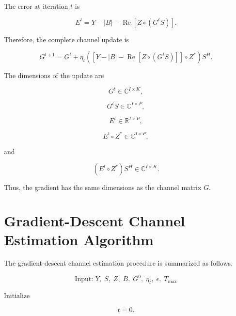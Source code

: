 \documentclass[12pt,a4paper]{article}
\begin{document}
The error at iteration $t$ is

\begin{equation}
\boxed{
E^{t}
=
Y-|B|
-
\operatorname{Re}
[Z\circ(G^{t}S)]
}.
\tag{209}
\end{equation}

Therefore, the complete channel update is

\begin{equation}
\boxed{
G^{t+1}
=
G^{t}
+
\eta_t
\left(
\left[
Y-|B|
-
\operatorname{Re}
[Z\circ(G^{t}S)]
\right]
\circ
Z^{*}
\right)
S^{H}
}.
\tag{210}
\end{equation}

The dimensions of the update are

\begin{equation}
G^{t}\in\mathbb{C}^{I\times K},
\tag{211}
\end{equation}

\begin{equation}
G^{t}S
\in
\mathbb{C}^{I\times P},
\tag{212}
\end{equation}

\begin{equation}
E^{t}
\in
\mathbb{R}^{I\times P},
\tag{213}
\end{equation}

\begin{equation}
E^{t}\circ Z^{*}
\in
\mathbb{C}^{I\times P},
\tag{214}
\end{equation}

and

\begin{equation}
(E^{t}\circ Z^{*})S^{H}
\in
\mathbb{C}^{I\times K}.
\tag{215}
\end{equation}

Thus, the gradient has the same dimensions as the channel matrix $G$.

\section{Gradient-Descent Channel Estimation Algorithm}

The gradient-descent channel estimation procedure is summarized as follows.

\begin{equation}
\boxed{
\text{Input: }
Y,\;S,\;Z,\;B,\;G^{0},\;\eta_t,\;\epsilon,\;T_{\max}
}
\tag{216}
\end{equation}

Initialize

\begin{equation}
t=0.
\tag{217}
\end{equation}
\end{document}
